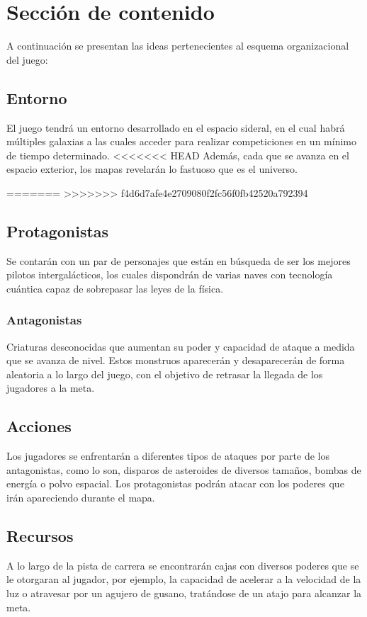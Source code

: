 \documentclass{article}
\begin{document}
\section{Sección de contenido} \label{contenido}
A continuación se presentan las ideas pertenecientes al esquema organizacional del juego:

\subsection{Entorno}
El juego tendrá un entorno desarrollado en el espacio sideral, en el cual habrá múltiples galaxias a las cuales acceder para realizar competiciones en un mínimo de tiempo determinado.
<<<<<<< HEAD
Además, cada que se avanza en el espacio exterior, los mapas revelarán lo fastuoso que es el universo.

=======
>>>>>>> f4d6d7afe4e2709080f2fc56f0fb42520a792394
\subsection{Protagonistas}
Se contarán con un par de personajes que están en búsqueda de ser los mejores pilotos intergalácticos, los cuales dispondrán de varias naves con tecnología cuántica capaz de sobrepasar las leyes de la física.

\subsubsection{Antagonistas}
Criaturas desconocidas que aumentan su poder y capacidad de ataque a medida que se avanza de nivel. Estos monstruos aparecerán y desaparecerán de forma aleatoria a lo largo del juego, con el objetivo de retrasar la llegada de los jugadores a la meta.

\subsection{Acciones}
Los jugadores se enfrentarán a diferentes tipos de ataques por parte de los antagonistas, como lo son, disparos de asteroides de diversos tamaños, bombas de energía o polvo espacial.
Los protagonistas podrán atacar con los poderes que irán apareciendo durante el mapa.

\subsection{Recursos}
A lo largo de la pista de carrera se encontrarán cajas con diversos poderes que se le otorgaran al jugador, por ejemplo, la capacidad de acelerar a la velocidad de la luz o atravesar por un agujero de gusano, tratándose de un atajo para alcanzar la meta.
\end{document}
